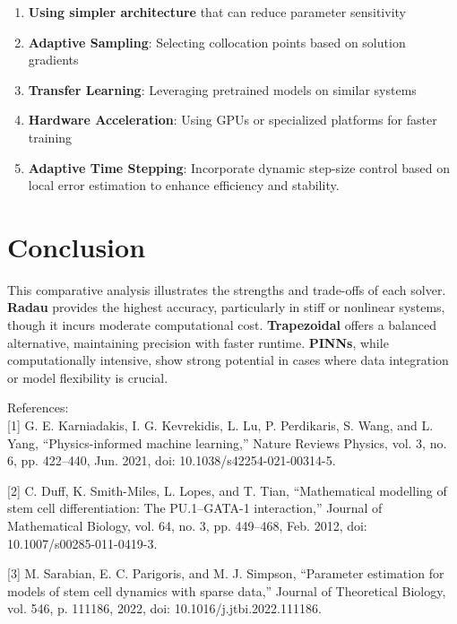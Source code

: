 \documentclass[journal]{IEEEtran}
\begin{document}
\begin{enumerate}
   \item\textbf{Using simpler architecture}  that can reduce parameter sensitivity
  \item \textbf{Adaptive Sampling}: Selecting collocation points based on solution gradients
    \item \textbf{Transfer Learning}: Leveraging pretrained models on similar systems
    \item \textbf{Hardware Acceleration}: Using GPUs or specialized platforms for faster training
    \item\textbf{Adaptive Time Stepping}: Incorporate dynamic step-size control based on local error estimation to enhance efficiency and stability.


\end{enumerate}


\section{ Conclusion}

This comparative analysis illustrates the strengths and trade-offs of each solver. \textbf{Radau} provides the highest accuracy, particularly in stiff or nonlinear systems, though it incurs moderate computational cost. \textbf{Trapezoidal} offers a balanced alternative, maintaining precision with faster runtime. \textbf{PINNs}, while computationally intensive, show strong potential in cases where data integration or model flexibility is crucial.

\printbibliography
\vspace{0.5em}
References:  \\[0.001in]

[1] G. E. Karniadakis, I. G. Kevrekidis, L. Lu, P. Perdikaris, S. Wang, and L. Yang, “Physics-informed machine learning,” Nature Reviews Physics, vol. 3, no. 6, pp. 422–440, Jun. 2021, doi: 10.1038/s42254-021-00314-5.

[2] C. Duff, K. Smith-Miles, L. Lopes, and T. Tian, “Mathematical modelling of stem cell differentiation: The PU.1–GATA-1 interaction,” Journal of Mathematical Biology, vol. 64, no. 3, pp. 449–468, Feb. 2012, doi: 10.1007/s00285-011-0419-3.

[3] M. Sarabian, E. C. Parigoris, and M. J. Simpson, “Parameter estimation for models of stem cell dynamics with sparse data,” Journal of Theoretical Biology, vol. 546, p. 111186, 2022, doi: 10.1016/j.jtbi.2022.111186.
 
\end{document}
